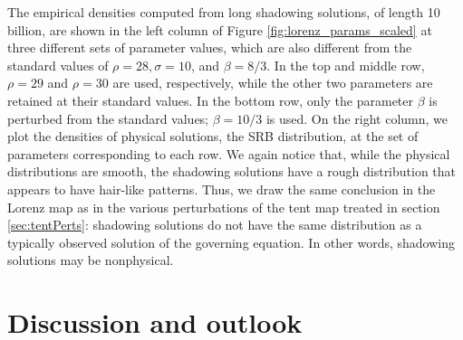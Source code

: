 The empirical densities computed from long shadowing solutions, of length 10 billion, are shown in the left column of Figure \ref{fig:lorenz_params_scaled} at three different sets of parameter values, which are also different from the standard values of $\rho = 28, \sigma = 10$, and $\beta = 8/3$. 
In the top and middle row, $\rho = 29$ and $\rho = 30$ are used, respectively, while the other two parameters are retained at their standard values. In the bottom row, only the parameter $\beta$ is perturbed from the standard values; $\beta = 10/3$ is used. On the right column, we plot the densities of physical solutions, the SRB distribution, at the set of parameters corresponding to each row. We again notice that, while the physical distributions are smooth, the shadowing solutions have a rough distribution that appears to have hair-like patterns. Thus, we draw the same conclusion in the Lorenz map as in the various perturbations of the tent map treated in section \ref{sec:tentPerts}: shadowing solutions do not have the same distribution as a typically observed solution of the governing equation. In other words, shadowing solutions may be nonphysical.


\section{Discussion and outlook}

